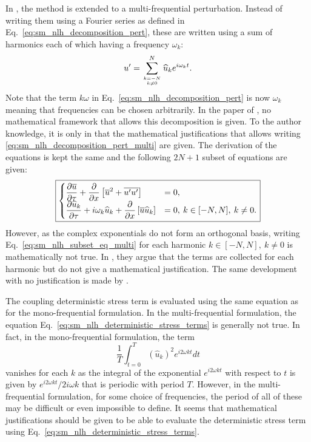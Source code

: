 In \citet{He2002}, the method is extended to a multi-frequential
perturbation. Instead of writing them
using a Fourier series as defined in Eq.~\ref{eq:sm_nlh_decomposition_pert},
these are written using a sum of harmonics each of which
having a frequency $\omega_k$:
\begin{equation}
	u^\prime = \sum_{k=-N \atop k \neq 0}^{N} 
	\widehat{u}_k e^{i \omega_k t}.
	\label{eq:sm_nlh_decomposition_pert_multi}
\end{equation}
Note that the term $k \omega$ in Eq.~\ref{eq:sm_nlh_decomposition_pert}
is now $\omega_k$ meaning that frequencies can be chosen
arbitrarily. In the paper of \citet{He2002}, no mathematical
framework that allows this decomposition is given. To the author
knowledge, it is only in \cite{JGuedeney2013} that the mathematical
justifications that allows writing 
\ref{eq:sm_nlh_decomposition_pert_multi} are given.
The derivation of the equations is kept the same and the following
$2N+1$ subset of equations are given:
\begin{equation}
	\fbox{$
	\begin{cases}
		\displaystyle
		\frac{\partial \overline{u}}{\partial \tau} +
		\frac{\partial}{\partial x}
			\left[\overline{u}^2 + 
			\overline{u^\prime u^\prime}\right] &=
			0, \\
		\displaystyle
		\frac{\partial \widehat{u}_k}{\partial \tau} + 
		i \omega_k \widehat{u}_k + 
			\frac{\partial}{\partial x} 
			\left[ \overline{u} \widehat{u}_k\right] &= 
			0, \: k \in [-N, N], \: k \neq 0.
	\end{cases}
	$}
	\label{eq:sm_nlh_subset_eq_multi}
\end{equation}
However, as the complex exponentials do not form
an orthogonal basis, writing Eq.~\ref{eq:sm_nlh_subset_eq_multi}
for each harmonic $k \in [-N, N], \: k \neq 0$ is mathematically
not true. In \citet{He2002}, they argue that the terms
are collected for each harmonic but do not give a mathematical 
justification. The same development with no justification is
made by \citet{Vilmin2006}.

The coupling deterministic stress term is evaluated using the
same equation as for the mono-frequential formulation.
In the multi-frequential formulation, 
the equation Eq.~\ref{eq:sm_nlh_deterministic_stress_terms}
is generally not true.
In fact, in the mono-frequential formulation, the term
\begin{equation}
	\frac{1}{T} \int_{t=0}^{T} (\widehat{u}_k)^2
		e^{i 2 \omega k t} dt
\end{equation}
vanishes for each $k$ as the integral of the
exponential $e^{i 2 \omega k t}$ with respect to $t$
is given by $e^{i 2 \omega k t} / 2 i \omega k$ that is
periodic with period $T$. However, in the multi-frequential
formulation, for some choice of frequencies, the period of all
of these may be difficult or even impossible to define. It
seems that mathematical justifications should be given
to be able to evaluate the deterministic stress term 
using Eq.~\ref{eq:sm_nlh_deterministic_stress_terms}.

